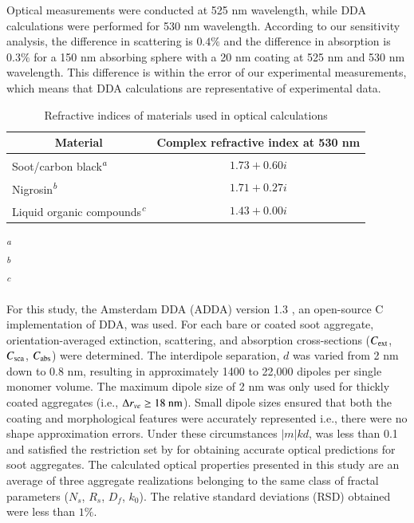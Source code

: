 Optical measurements were conducted at 525 nm wavelength, while DDA calculations were performed for 530 nm wavelength. According to our sensitivity analysis, the difference in scattering is $0.4 \%$ and the difference in absorption is $0.3 \%$ for a 150 nm absorbing sphere with a 20 nm coating at 525 nm and 530 nm wavelength. This difference is within the error of our experimental measurements, which means that DDA calculations are representative of experimental data.

\begin{table}[ht]
\caption{Refractive indices of materials used in optical calculations}
\label{tab:refindices}
\begin{center}
\begin{tabular}{l c}
 \hline
 \multicolumn{1}{c}{Material} & Complex refractive index at 530 nm \\
 \hline
 Soot/carbon black\textsuperscript{\textit{a}} & $1.73+0.60i$\\
 Nigrosin\textsuperscript{\textit{b}} & $1.71+0.27i$\\
 Liquid organic compounds\textsuperscript{\textit{c}} & $1.43+0.00i$\\
 \hline
\end{tabular}
\end{center}

\textsuperscript{\textit{a}}\citet{RN23}\\
\textsuperscript{\textit{b}}\citet{RN15}\\
\textsuperscript{\textit{c}}\citet{RN22}
\end{table}

For this study, the Amsterdam DDA (ADDA) version 1.3 \citep{RN11}, an open-source C implementation of DDA, was used. For each bare or coated soot aggregate, orientation-averaged extinction, scattering, and absorption cross-sections ($C_{\rm ext}$, $C_{\rm sca}$, $C_{\rm abs}$) were determined. The interdipole separation, $d$ was varied from 2 nm down to 0.8 nm, resulting in approximately 1400 to 22,000 dipoles per single monomer volume. The maximum dipole size of 2 nm was only used for thickly coated aggregates (i.e., $\Delta r_{ve}\ge 18\ \rm nm$). Small dipole sizes ensured that both the coating and morphological features were accurately represented i.e., there were no shape approximation errors. Under these circumstances $|m|kd$, was less than 0.1 and satisfied the restriction set by \citet{RN32} for obtaining accurate optical predictions for soot aggregates. The calculated optical properties presented in this study are an average of three aggregate realizations belonging to the same class of fractal parameters ($N_s$, $R_s$, $D_f$, $k_0$). The relative standard deviations (RSD) obtained were less than $1\%$.
